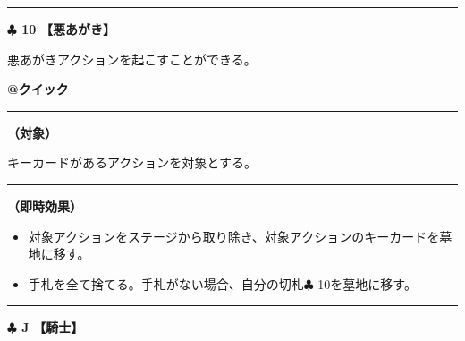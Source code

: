 \documentclass[twocolumn,a5paper,papersize,10pt]{jarticle}
\begin{document}
 
 
 

\vspace{3mm} %
\hrule height 0.5mm depth 0mm width 66.5mm %
\vspace{1mm} %
{\Large\bf $\clubsuit$ 10} {\normalsize\bf【悪あがき】} %
\vspace{1mm} %

悪あがきアクションを起こすことができる。

\begin{tcolorbox}[title={\small\bf【Action】悪あがき}{\scriptsize （速攻魔法）}]

{\scriptsize\bf @クイック }

\vspace{1mm} %
\hrule height 0.1mm depth 0mm width 62mm %
\vspace{1mm} %

{\bf（対象）}

キーカードがあるアクションを対象とする。

\vspace{1mm} %
\hrule height 0.1mm depth 0mm width 62mm %
\vspace{1mm} %

{\bf（即時効果）}


\vspace{-1zh}%
\begin{itemize}
\setlength{\leftskip}{-0.3cm}
\setlength{\parskip}{0pt} %

\item 対象アクションをステージから取り除き、対象アクションのキーカードを墓地に移す。

\item 手札を全て捨てる。手札がない場合、自分の切札{\normalsize $\clubsuit$} 10を墓地に移す。
\vspace{-1zh}%
\end{itemize}

\vspace{1mm} %
\end{tcolorbox}

\vspace{-1zh}

 
 
 
 
 

\vspace{3mm} %
\hrule height 0.5mm depth 0mm width 66.5mm %
\vspace{1mm} %
{\Large\bf $\clubsuit$ J} {\normalsize\bf【騎士】} %
\vspace{1mm} %
\end{document}
